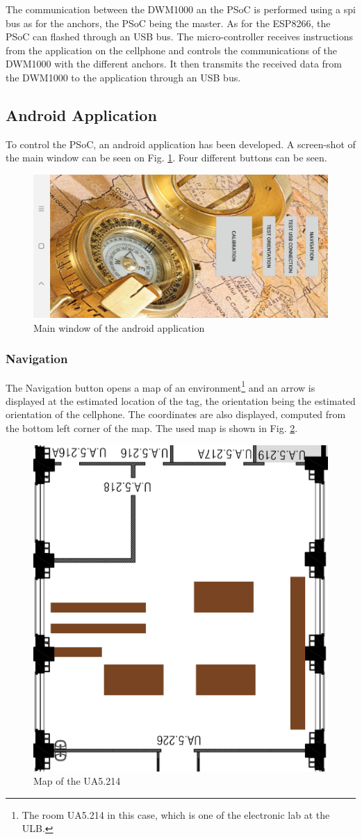 The communication between the DWM1000 an the PSoC is performed using a \gls{spi} bus as for the anchors, the PSoC being the master. As for the ESP8266, the PSoC can flashed through an USB bus. The micro-controller receives instructions from the application on the cellphone and controls the communications of the DWM1000 with the different anchors. It then transmits the received data from the DWM1000 to the application through an USB bus.

\subsection{Android Application}

To control the PSoC, an android application has been developed. A screen-shot of the main window can be seen on Fig. \ref{fig:android_app}. Four different buttons can be seen.

\begin{figure}[H]
	\centering
	\includegraphics[width=.8\linewidth]{Images/app_main.jpg}
	\caption{Main window of the android application}
	\label{fig:android_app}
\end{figure}

\subsubsection{Navigation}

The Navigation button opens a map of an environment\footnote{The room UA5.214 in this case, which is one of the electronic lab at the ULB.} and an arrow is displayed at the estimated location of the tag, the orientation being the estimated orientation of the cellphone. The coordinates are also displayed, computed from the bottom left corner of the map. The used map is shown in Fig. \ref{fig:ua5_map}.

\begin{figure}[H]
	\centering
	\includegraphics[width=.4\linewidth]{Images/little_room.png}
	\caption{Map of the UA5.214}
	\label{fig:ua5_map}
\end{figure}

